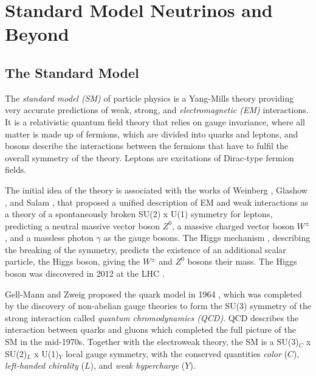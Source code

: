 \setchapterpreamble[u]{\margintoc}

\chapter{Standard Model Neutrinos and Beyond}


\section{The Standard Model}

The \textit{standard model (SM)} of particle physics is a Yang-Mills theory  providing very accurate predictions of weak, strong, and \textit{electromagnetic (EM)} interactions. It is a relativistic quantum field theory that relies on gauge invariance, where all matter is made up of fermions, which are divided into quarks and leptons, and bosons describe the interactions between the fermions that have to fulfil the overall symmetry of the theory. Leptons are excitations of Dirac-type fermion fields.

The initial idea of the theory is associated with the works of Weinberg , Glashow , and Salam \cite{Salam}, that proposed a unified description of EM and weak interactions as a theory of a spontaneously broken SU(2) x U(1) symmetry for leptons, predicting a neutral massive vector boson $Z^0$, a massive charged vector boson $W^\pm$, and a massless photon $\gamma$ as the gauge bosons. The Higgs mechanism , describing the breaking of the symmetry, predicts the existence of an additional scalar particle, the Higgs boson, giving the $W^\pm$ and $Z^0$ bosons their mass. The Higgs boson was discovered in 2012 at the LHC .

Gell-Mann and Zweig proposed the quark model in 1964 , which was completed by the discovery of non-abelian gauge theories \cite{non_abel_gauge} to form the SU(3) symmetry of the strong interaction called \textit{quantum chromodynamics (QCD)}. QCD describes the interaction between quarks and gluons which completed the full picture of the SM in the mid-1970s. Together with the electroweak theory, the SM is a SU(3)$_C$ x SU(2)$_L$ x U(1)$_Y$ local gauge symmetry, with the conserved quantities \textit{color} ($C$), \textit{left-handed chirality} ($L$), and \textit{weak hypercharge} ($Y$).

